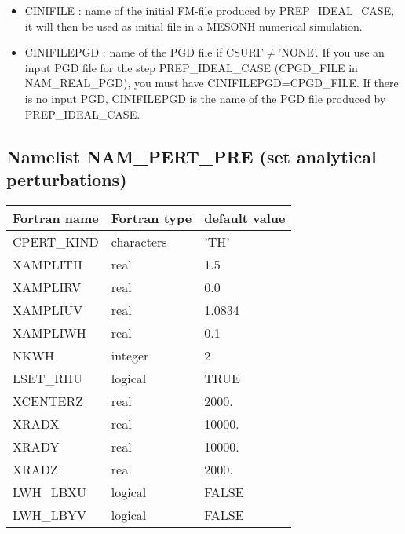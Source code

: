 \begin{itemize}
\item CINIFILE  : name of the initial FM-file  produced by PREP\_IDEAL\_CASE, it will then 
be used as initial file in a MESONH numerical simulation.
\item CINIFILEPGD  : name of the PGD file if CSURF$\neq$'NONE'. If you use an input PGD file for the step PREP\_IDEAL\_CASE (CPGD\_FILE in NAM\_REAL\_PGD), you must have CINIFILEPGD=CPGD\_FILE. If there is no input PGD, CINIFILEPGD is the name of the PGD file produced by PREP\_IDEAL\_CASE.
\end{itemize} 

\subsection{Namelist NAM\_PERT\_PRE (set analytical perturbations) }

\begin{center}
\begin{tabular} {|l|l|l|}
\hline
Fortran name & Fortran type & default value \\
\hline
CPERT\_KIND         & characters & 'TH'  \\
XAMPLITH            & real       & 1.5   \\
XAMPLIRV            & real       & 0.0   \\
XAMPLIUV            & real       & 1.0834   \\
XAMPLIWH            & real       & 0.1   \\
NKWH                & integer    & 2    \\
LSET\_RHU           & logical    & TRUE \\
XCENTERZ            & real       & 2000. \\
XRADX               & real       & 10000. \\
XRADY               & real       & 10000. \\
XRADZ               & real       & 2000. \\
LWH\_LBXU           & logical    & FALSE \\
LWH\_LBYV           & logical    & FALSE \\
\hline
\end{tabular}
\end{center}

